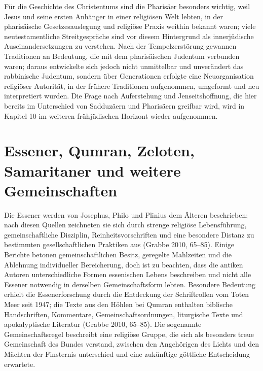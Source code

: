 \documentclass[fontsize=12pt]{mybib}
\begin{document}
Für die Geschichte des Christentums sind die Pharisäer besonders wichtig, weil Jesus und seine ersten Anhänger in einer religiösen Welt lebten, in der pharisäische Gesetzesauslegung und religiöse Praxis weithin bekannt waren; viele neutestamentliche Streitgespräche sind vor diesem Hintergrund als innerjüdische Auseinandersetzungen zu verstehen. Nach der Tempelzerstörung gewannen Traditionen an Bedeutung, die mit dem pharisäischen Judentum verbunden waren; daraus entwickelte sich jedoch nicht unmittelbar und unverändert das rabbinische Judentum, sondern über Generationen erfolgte eine Neuorganisation religiöser Autorität, in der frühere Traditionen aufgenommen, umgeformt und neu interpretiert wurden. Die Frage nach Auferstehung und Jenseitshoffnung, die hier bereits im Unterschied von Sadduzäern und Pharisäern greifbar wird, wird in Kapitel 10 im weiteren frühjüdischen Horizont wieder aufgenommen.

\section{Essener, Qumran, Zeloten, Samaritaner und weitere Gemeinschaften}

Die Essener werden von Josephus, Philo und Plinius dem Älteren beschrieben; nach diesen Quellen zeichneten sie sich durch strenge religiöse Lebensführung, gemeinschaftliche Disziplin, Reinheitsvorschriften und eine besondere Distanz zu bestimmten gesellschaftlichen Praktiken aus (Grabbe 2010, 65–85). Einige Berichte betonen gemeinschaftlichen Besitz, geregelte Mahlzeiten und die Ablehnung individueller Bereicherung, doch ist zu beachten, dass die antiken Autoren unterschiedliche Formen essenischen Lebens beschreiben und nicht alle Essener notwendig in derselben Gemeinschaftsform lebten. Besondere Bedeutung erhielt die Essenerforschung durch die Entdeckung der Schriftrollen vom Toten Meer seit 1947; die Texte aus den Höhlen bei Qumran enthalten biblische Handschriften, Kommentare, Gemeinschaftsordnungen, liturgische Texte und apokalyptische Literatur (Grabbe 2010, 65–85). Die sogenannte Gemeinschaftsregel beschreibt eine religiöse Gruppe, die sich als besonders treue Gemeinschaft des Bundes verstand, zwischen den Angehörigen des Lichts und den Mächten der Finsternis unterschied und eine zukünftige göttliche Entscheidung erwartete.
\end{document}
